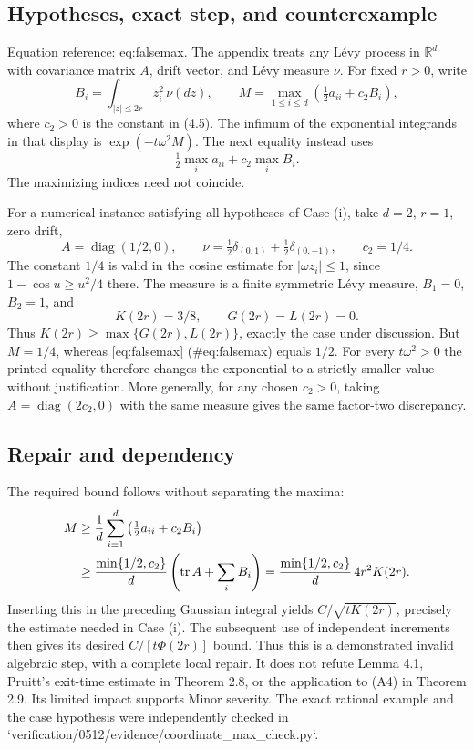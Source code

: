 \documentclass[10pt]{article}
\begin{document}
\subsection*{Hypotheses, exact step, and counterexample}
Equation reference: eq:falsemax. The appendix treats any Lévy process in \(\mathbb R^d\) with covariance matrix \(A\), drift vector, and Lévy measure \(\nu\). For fixed \(r>0\), write \[B_i=\int_{|z|\leq2r}z_i^2\,\nu(dz),\qquad
 M=\max_{1\leq i\leq d}\left(\tfrac12a_{ii}+c_2 B_i\right),\] where \(c_2>0\) is the constant in (4.5). The infimum of the exponential integrands in that display is \(\exp(-t\omega^2 M)\). The next equality instead uses \[
 \tfrac12\max_i a_{ii}+c_2\max_i B_i .\] The maximizing indices need not coincide.\par
For a numerical instance satisfying all hypotheses of Case (i), take \(d=2\), \(r=1\), zero drift, \[A=\operatorname{diag}(1/2,0),\qquad
 \nu=\tfrac12\delta_{(0,1)}+\tfrac12\delta_{(0,-1)},\qquad c_2=1/4.\] The constant \(1/4\) is valid in the cosine estimate for \(|\omega z_i|\leq1\), since \(1-\cos u\geq u^2/4\) there. The measure is a finite symmetric Lévy measure, \(B_1=0\), \(B_2=1\), and \[K(2r)=3/8,\qquad G(2r)=L(2r)=0.\] Thus \(K(2r)\geq\max\{G(2r),L(2r)\}\), exactly the case under discussion. But \(M=1/4\), whereas [eq:falsemax] (\#eq:falsemax) equals \(1/2\). For every \(t\omega^2>0\) the printed equality therefore changes the exponential to a strictly smaller value without justification. More generally, for any chosen \(c_2>0\), taking \(A=\operatorname{diag}(2c_2,0)\) with the same measure gives the same factor-two discrepancy.\par
\subsection*{Repair and dependency}
The required bound follows without separating the maxima: \[\begin{aligned}
 M&\geq\frac1d\sum_{i=1}^d
       \left(\tfrac12 a_{ii}+c_2 B_i\right) \notag\\
  &\geq \frac{\min\{1/2,c_2\}}{d}
     \left(\operatorname{tr}A+\sum_i B_i\right)
   =\frac{\min\{1/2,c_2\}}d\,4r^2K(2r).\end{aligned}\] Inserting this in the preceding Gaussian integral yields \(C/\sqrt{tK(2r)}\), precisely the estimate needed in Case (i). The subsequent use of independent increments then gives its desired \(C/[t\Phi(2r)]\) bound. Thus this is a demonstrated invalid algebraic step, with a complete local repair. It does not refute Lemma 4.1, Pruitt’s exit-time estimate in Theorem 2.8, or the application to (A4) in Theorem 2.9. Its limited impact supports Minor severity. The exact rational example and the case hypothesis were independently checked in `verification/0512/evidence/coordinate\_max\_check.py`.\par
\end{document}
